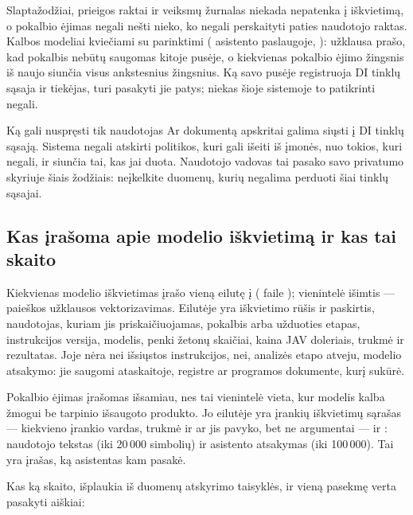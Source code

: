 Slaptažodžiai, prieigos raktai ir veiksmų žurnalas niekada nepatenka į iškvietimą, o pokalbio
ėjimas negali nešti nieko, ko negali perskaityti paties naudotojo raktas. Kalbos modeliai
kviečiami su parinktimi   ( asistento
paslaugoje, ): užklausa prašo, kad pokalbis nebūtų saugomas kitoje
pusėje, o kiekvienas pokalbio ėjimo žingsnis iš naujo siunčia visus ankstesnius žingsnius.
Ką savo pusėje registruoja DI tinklų sąsaja ir tiekėjas, turi pasakyti jie patys; niekas šioje
sistemoje to patikrinti negali.

\begin{humanbox}{Ką gali nuspręsti tik naudotojas}
Ar dokumentą apskritai galima siųsti į DI tinklų sąsają. Sistema negali atskirti politikos,
kuri gali išeiti iš įmonės, nuo tokios, kuri negali, ir siunčia tai, kas jai duota. Naudotojo
vadovas tai pasako savo privatumo skyriuje šiais žodžiais: neįkelkite duomenų, kurių negalima
perduoti šiai tinklų sąsajai.
\end{humanbox}

\subsection{Kas įrašoma apie modelio iškvietimą ir kas tai skaito}\label{sec:security:ai:logged}

Kiekvienas modelio iškvietimas įrašo vieną eilutę į  ( faile
); vienintelė išimtis --- paieškos užklausos vektorizavimas.
Eilutėje yra iškvietimo rūšis ir paskirtis, naudotojas, kuriam jis priskaičiuojamas, pokalbis
arba užduoties etapas, instrukcijos versija, modelis, penki žetonų skaičiai, kaina JAV
doleriais, trukmė ir rezultatas. Joje nėra nei išsiųstos instrukcijos, nei, analizės etapo
atveju, modelio atsakymo: jie saugomi ataskaitoje, registre ar programos dokumente, kurį
sukūrė.

Pokalbio ėjimas įrašomas išsamiau, nes tai vienintelė vieta, kur modelis kalba žmogui be
tarpinio išsaugoto produkto. Jo eilutėje yra įrankių iškvietimų sąrašas --- kiekvieno
įrankio vardas, trukmė ir ar jis pavyko, bet ne argumentai --- ir :
naudotojo tekstas (iki 20\,000 simbolių) ir asistento atsakymas (iki 100\,000). Tai yra
įrašas, ką asistentas kam pasakė.

Kas ką skaito, išplaukia iš duomenų atskyrimo taisyklės, ir vieną pasekmę verta
pasakyti aiškiai:

